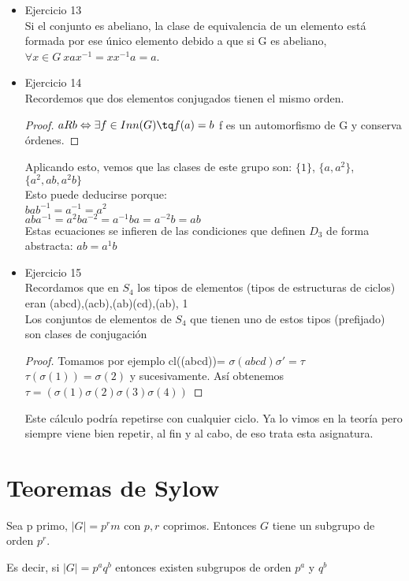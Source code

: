 \documentclass[nochap]{apuntes}
\begin{document}
\begin{itemize}
 \item Ejercicio 13\\
 Si el conjunto es abeliano, la clase de equivalencia de un elemento está formada por ese único elemento debido a que si G es abeliano,
 $\forall x \in G \ xax^{-1}=xx^{-1}a=a$.\

 \item Ejercicio 14\\
 Recordemos que dos elementos conjugados tienen el mismo orden.
 \begin{proof}
  $aRb \Leftrightarrow \exists f \in Inn(G) \tq f(a)=b$  f es un automorfismo de G y conserva órdenes.
 \end{proof}
 Aplicando esto, vemos que las clases de este grupo son: $\{1\}$, $\{a, a^{2}\}$, $\{a^{2}, ab, a^{2}b\}$\\
 Esto puede deducirse porque:\\
 $bab^{-1}=a^{-1}=a^{2}$\\
 $aba^{-1}=a^{2}ba^{-2}=a^{-1}ba=a^{-2}b=ab$\\
 Estas ecuaciones se infieren de las condiciones que definen $D_3$ de forma abstracta: $ab=a^{1}b$\\

 \item Ejercicio 15\\
 Recordamos que en $S_4$  los tipos de elementos (tipos de estructuras de ciclos) eran (abcd),(acb),(ab)(cd),(ab), 1\\
 Los conjuntos de elementos de $S_4$  que tienen uno de estos tipos (prefijado) son clases de conjugación\\
 \begin{proof}
  Tomamos por ejemplo cl((abcd))= $\sigma (abcd) \sigma'= \tau$\\
  $\tau(\sigma(1))=\sigma(2)$  y sucesivamente. Así obtenemos
  $\tau = (\sigma(1)\sigma(2)\sigma(3)\sigma(4))$
 \end{proof}

 Este cálculo podría repetirse con cualquier ciclo. Ya lo vimos en la teoría pero siempre viene bien repetir, al fin y al cabo, de eso trata esta asignatura.
\end{itemize}

\section{Teoremas de Sylow}
\begin{theorem}
 Sea p primo, $|G|=p^{r}m$  con $p, r$ coprimos. Entonces $G$ tiene un subgrupo de orden $p^{r}$.

 Es decir, si $|G|=p^{a}q^{b}$ entonces existen subgrupos de orden $p^{a}$  y $q^{b}$
\end{theorem}
\end{document}
